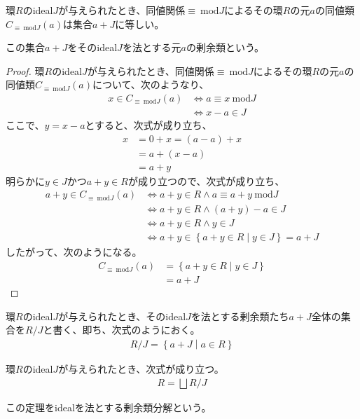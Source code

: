 \documentclass[dvipdfmx]{jsarticle}
\begin{document}
\begin{thm}\label{3.3.2.8}
環$R$のideal$J$が与えられたとき、同値関係$\equiv \ \mathrm{mod}J $によるその環$R$の元$a$の同値類$C_{\equiv \ \mathrm{mod}J }(a)$は集合$a + J$に等しい。
\end{thm}
\begin{dfn}
この集合$a + J$をそのideal$J$を法とする元$a$の剰余類という。
\end{dfn}
\begin{proof}
環$R$のideal$J$が与えられたとき、同値関係$\equiv \ \mathrm{mod}J $によるその環$R$の元$a$の同値類$C_{\equiv \ \mathrm{mod}J }(a)$について、次のようなり、
\begin{align*}
x \in C_{\equiv \ \mathrm{mod}J }(a) &\Leftrightarrow a \equiv x\ \mathrm{mod}J \\
&\Leftrightarrow x - a \in J
\end{align*}
ここで、$y = x - a$とすると、次式が成り立ち、
\begin{align*}
x &= 0 + x = (a - a) + x\\
&= a + (x - a)\\
&= a + y
\end{align*}
明らかに$y \in J$かつ$a + y \in R$が成り立つので、次式が成り立ち、
\begin{align*}
a + y \in C_{\equiv \ \mathrm{mod}J }(a) &\Leftrightarrow a + y \in R \land a \equiv a + y\ \mathrm{mod}J \\
&\Leftrightarrow a + y \in R \land (a + y) - a \in J\\
&\Leftrightarrow a + y \in R \land y \in J\\
&\Leftrightarrow a + y \in \left\{ a + y \in R \middle| y \in J \right\} = a + J
\end{align*}
したがって、次のようになる。
\begin{align*}
C_{\equiv \ \mathrm{mod}J }(a) &= \left\{ a + y \in R \middle| y \in J \right\}\\
&= a + J
\end{align*}
\end{proof}
\begin{dfn}
環$R$のideal$J$が与えられたとき、そのideal$J$を法とする剰余類たち$a + J$全体の集合を${R}/{J}$と書く、即ち、次式のようにおく。
\begin{align*}
{R}/{J} = \left\{ a + J \middle| a \in R \right\}
\end{align*}
\end{dfn}
\begin{thm}[idealを法とする剰余類分解]\label{3.3.2.7s}
環$R$のideal$J$が与えられたとき、次式が成り立つ。
\begin{align*}
R=\bigsqcup {R/J}
\end{align*}\par
この定理をidealを法とする剰余類分解という。
\end{thm}
\end{document}
